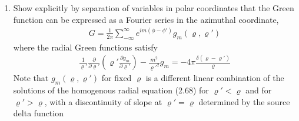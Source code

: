 \documentclass[letter,12pt]{article}
\theoremstyle{definition}
\newtheorem*{sol}{Solution}
\begin{document}
\begin{enumerate}
\begin{enumerate}
\begin{sol}
\begin{align*}
                        &= \ln \frac{4Z^2 + \alpha^2}{\alpha^2}
                        \\
                        &= \ln \left(4Z^2 + \alpha^2\right) - \ln \alpha^2
                        \\
                        G(Z \gg \alpha) &= \ln 4Z^2 - \ln \alpha^2
                    \end{align*}
                    \begin{align*}
                        \therefore
                        G(x, y; x', y') &= - \ln \alpha^2
                        \\
                        &= - \ln \left[{(x - x')}^2 + {(y - y')}^2\right]
                    \end{align*}
                    Changing to cylindrical coordinates yields
                    \begin{align*}
                        G(x, y;x',y') &= - \ln \left[ \varrho^2 + \varrho'^2 - 2 \varrho \varrho' \cos( \phi - \phi' )\right]
                    \end{align*}
                \end{sol}
            \item
                Show explicitly by separation of variables in polar
                coordinates that the Green function can be expressed
                as a Fourier series in the azimuthal coordinate,
                \begin{align*}
                    G = \frac{1}{2 \pi} \sum_{-\infty}^{\infty} e^{i m (\phi - \phi')}g_m(\varrho, \varrho')
                \end{align*}
                where the radial Green functions satisfy
                \begin{align*}
                    \frac{1}{\varrho'}\frac{\partial}{\partial \varrho'}
                    \left(
                        \varrho' \frac{\partial g_m}{\partial \varrho'}
                    \right)
                    - \frac{m^2}{\varrho'^2} g_m
                    =
                    - 4 \pi \frac{\delta(\varrho - \varrho')}{\varrho}
                \end{align*}
                Note that $g_m(\varrho, \varrho')$ for fixed $\varrho$
                is a different linear combination of the solutions of
                the homogenous radial equation (2.68) for $\varrho' <
                \varrho$ and for $\varrho' > \varrho$, with a
                discontinuity of slope at $\varrho' = \varrho$
                determined by the source delta function

\end{enumerate}
\end{enumerate}
\end{document}
